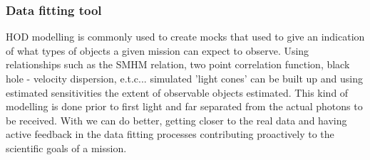 \subsubsection{Data fitting tool}

HOD modelling is commonly used to create mocks that used to give an indication of what types of objects a given mission can expect to observe. Using relationships such as the SMHM relation, two point correlation function, black hole - velocity dispersion, e.t.c... simulated 'light cones' can be built up and using estimated sensitivities the extent of observable objects estimated. This kind of modelling is done prior to first light and far separated from the actual photons to be received. With \steel we can do better, getting closer to the real data and having active feedback in the data fitting processes contributing proactively to the scientific goals of a mission. 


